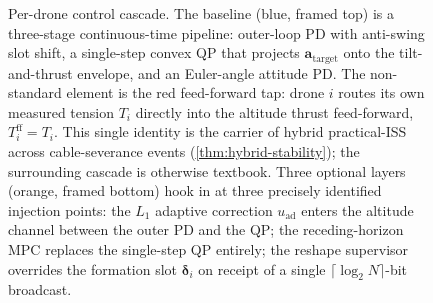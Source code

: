 \begin{figure}[t]
\caption{Per-drone control cascade. The baseline (blue, framed top) is
a three-stage continuous-time pipeline: outer-loop PD with anti-swing
slot shift, a single-step convex QP that projects
$\mathbf{a}_{\mathrm{target}}$ onto the tilt-and-thrust envelope, and an
Euler-angle attitude PD. The non-standard element is the red
feed-forward tap: drone $i$ routes its own measured tension $T_i$
directly into the altitude thrust feed-forward,
$T_i^{\mathrm{ff}} = T_i$. This single identity is the carrier of
hybrid practical-ISS across cable-severance events
(\cref{thm:hybrid-stability}); the surrounding cascade is otherwise
textbook. Three optional layers (orange, framed bottom) hook in at
three precisely identified injection points: the $L_1$ adaptive
correction $u_{\mathrm{ad}}$ enters the altitude channel between the
outer PD and the QP; the receding-horizon MPC replaces the single-step
QP entirely; the reshape supervisor overrides the formation slot
$\boldsymbol{\delta}_i$ on receipt of a single
$\lceil\log_2 N\rceil$-bit broadcast.}
\label{fig:controller-cascade}
\end{figure}
